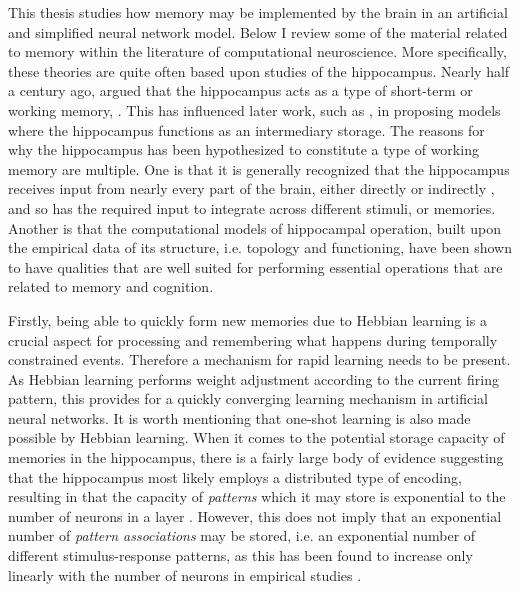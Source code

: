 This thesis studies how memory may be implemented by the brain in an artificial and simplified neural network model. Below I review some of the material related to memory within the literature of computational neuroscience. More specifically, these theories are quite often based upon studies of the hippocampus.
Nearly half a century ago, \cite{Marr1971} argued that the hippocampus acts as a type of short-term or working memory, \citep{Rolls1998chpt6}. This has influenced later work, such as \citep{McClelland1995}, in proposing models where the hippocampus functions as an intermediary storage. The reasons for why the hippocampus has been hypothesized to constitute a type of working memory are multiple. One is that it is generally recognized that the hippocampus receives input from nearly every part of the brain, either directly or indirectly \citep{Rolls1998chpt1}, and so has the required input to integrate across different stimuli, or memories. Another is that the computational models of hippocampal operation, built upon the empirical data of its structure, i.e. topology and functioning, have been shown to have qualities that are well suited for performing essential operations that are related to memory and cognition.

Firstly, being able to quickly form new memories due to Hebbian learning is a crucial aspect for processing and remembering what happens during temporally constrained events. Therefore a mechanism for rapid learning needs to be present. As Hebbian learning performs weight adjustment according to the current firing pattern, this provides for a quickly converging learning mechanism in artificial neural networks. It is worth mentioning that one-shot learning is also made possible by Hebbian learning. 
When it comes to the potential storage capacity of memories in the hippocampus, there is a fairly large body of evidence suggesting that the hippocampus most likely employs a distributed type of encoding, resulting in that the capacity of \textit{patterns} which it may store is exponential to the number of neurons in a layer \citep{Rolls1998chpt6}. However, this does not imply that an exponential number of \textit{pattern associations} may be stored, i.e. an exponential number of different stimulus-response patterns, as this has been found to increase only linearly with the number of neurons in empirical studies \citep{Rolls1998chpt6}.

